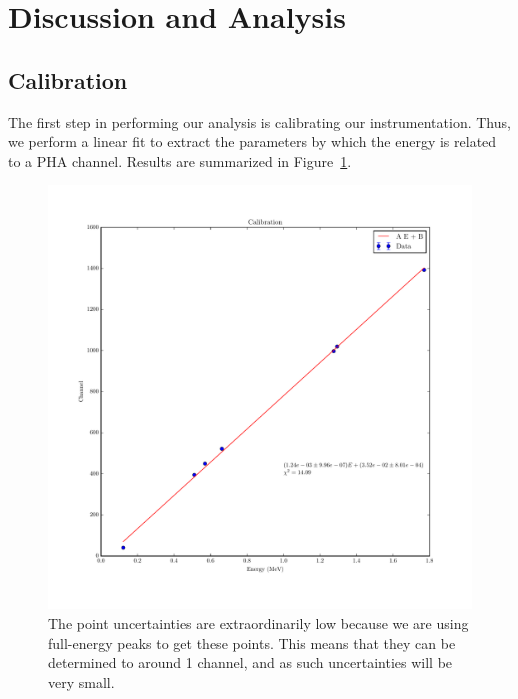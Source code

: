 \documentclass[reprint, nobibnotes, amssymb, amsmath, amsfonts, physics, mathtools, mathrsfs, floatfix]{revtex4-1}
\begin{document}
  \section{Discussion and Analysis}
    \subsection{Calibration}
      The first step in performing our analysis is calibrating our instrumentation.  Thus, we perform a linear fit to extract the parameters by which the energy is related to a PHA channel.  Results are summarized in Figure~\ref{fig:calibration}.

      \begin{widetext}

        \begin{figure}[h]
          \centering
          \includegraphics[width=\linewidth]{../plots/calibration.pdf}
          \caption{The point uncertainties are extraordinarily low because we are using full-energy peaks to get these points.  This means that they can be determined to around 1 channel, and as such uncertainties will be very small. \label{fig:calibration}}
        \end{figure}

      \end{widetext}
\end{document}

